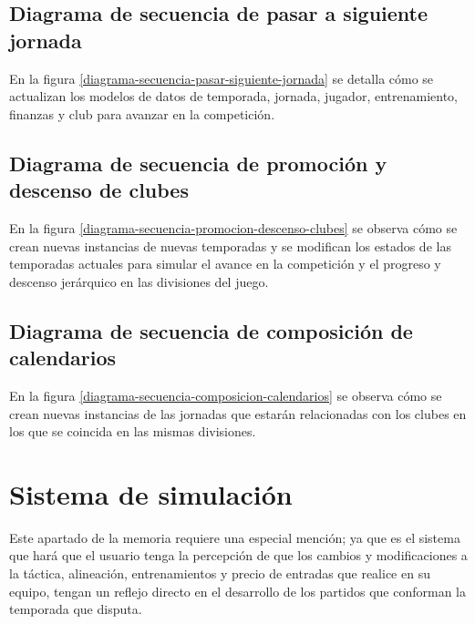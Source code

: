 

\subsection*{Diagrama de secuencia de pasar a siguiente jornada}
En la figura \ref{diagrama-secuencia-pasar-siguiente-jornada} se detalla cómo se
actualizan los modelos de datos de temporada, jornada, jugador, entrenamiento,
finanzas y club para avanzar en la competición.
\newpage
 

\subsection*{Diagrama de secuencia de promoción y descenso de clubes}
En la figura \ref{diagrama-secuencia-promocion-descenso-clubes} se observa cómo
se crean nuevas instancias de nuevas temporadas y se modifican los estados de
las temporadas actuales para simular el avance en la competición y el progreso y
descenso jerárquico en las divisiones del juego.



\subsection*{Diagrama de secuencia de composición de calendarios}
En la figura \ref{diagrama-secuencia-composicion-calendarios} se observa cómo se
crean nuevas instancias de las jornadas que estarán relacionadas con los clubes
en los que se coincida en las mismas divisiones.
\newpage


\section{Sistema de simulación}
Este apartado de la memoria requiere una especial mención; ya que es el
sistema que hará que el usuario tenga la percepción de que los cambios y
modificaciones a la táctica, alineación, entrenamientos y precio de entradas
que realice en su equipo, tengan un reflejo directo en el desarrollo de los
partidos que conforman la temporada que disputa.

